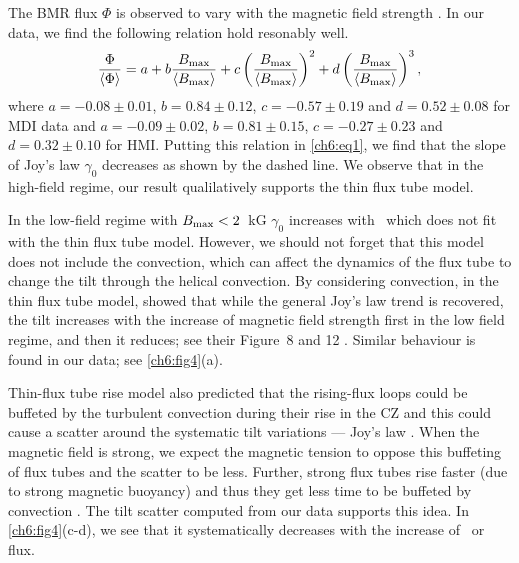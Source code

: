 The BMR flux $\Phi$ is observed to vary with the
magnetic field strength \citep{Tlatov2014}. 
In our data, we find the following relation hold resonably well.
\begin{equation}
\frac{\Phi} {\left\langle \Phi \right\rangle} = a + b \frac{B_{\rm max}} {\left\langle B_{\rm max} \right\rangle} + c \left( \frac{B_{\rm max}} {\left\langle B_{\rm max} \right\rangle} \right) ^2+ d \left( \frac{B_{\rm max}} {\left\langle B_{\rm max} \right\rangle} \right) ^3,
\label{eq:eq3}
\end{equation}
where $a=-0.08 \pm 0.01$, $b=0.84 \pm 0.12$,  $c=-0.57 \pm 0.19$ and $d= 0.52 \pm 0.08$ for MDI data and $a=-0.09\pm 0.02$, $b=0.81 \pm 0.15$,
$c=-0.27 \pm 0.23$ and $d= 0.32 \pm 0.10$ for HMI. Putting this relation in \autoref{ch6:eq1}, we find that the slope of Joy's law $\gamma_0$ decreases as shown by the dashed line.
We observe that in the high-field regime, our result qualilatively supports the thin flux tube model.


In the low-field regime with $B_{\rm max} < 2$~kG 
$\gamma_0$ increases with \Bmax\ which does not fit with the thin flux tube model. However,
we should not forget that this model does not include the convection, which can affect the dynamics of the flux tube to
change the tilt through the helical convection.
By considering convection, in the thin flux tube model,
\citet{Weber2011} showed that while the general Joy's law trend is recovered,
the tilt increases with the increase of magnetic field strength first in the low
field regime, and then it reduces; see their Figure~8 and 12 \citep[also see][]{Weber2013}. 
Similar behaviour is found in our data; see \autoref{ch6:fig4}(a).

Thin-flux tube rise model also predicted that the rising-flux loops could be buffeted by the turbulent convection
during their rise in the CZ and this could cause a scatter
around the systematic tilt variations --- Joy's law \citep{Longcope1996, Longcope2002}.
When the magnetic field is strong, we expect the magnetic tension to oppose this buffeting of flux tubes and
the scatter to be less. Further, strong flux tubes rise faster (due to strong magnetic buoyancy)
and thus they get less time to be buffeted by  convection \citep{Weber2011}.
The tilt scatter computed from our data supports this idea. In \autoref{ch6:fig4}(c-d),
we see that it systematically decreases with the increase of \Bmax\ or flux.


